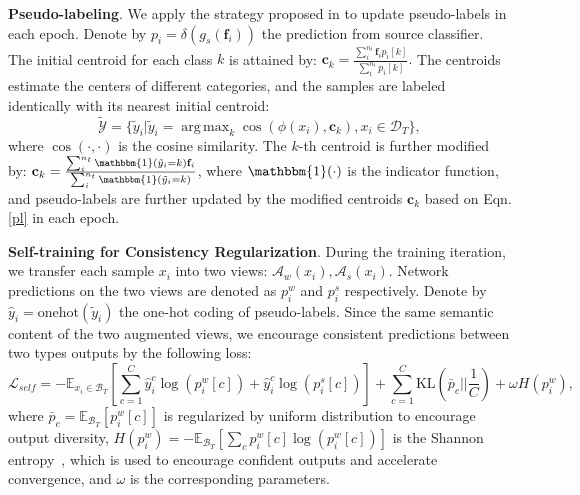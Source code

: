 \documentclass{article}
\def\vf{{\bm{f}}}
\DeclareMathOperator*{\argmax}{arg\,max}
\begin{document}
\textbf{Pseudo-labeling}. We apply the strategy proposed in \cite{shot} to update pseudo-labels in each epoch. Denote by ${p}_i = \delta(g_s(\vf_i))$ the prediction from source classifier. The initial centroid for each class $k$ is attained by:
$
    \textbf{c}_k = \frac{\sum_i^{n_t}\vf_i {p}_i[k]}{\sum_i^{n_t} {p}_i[k]}.
$
The centroids estimate the centers of different categories, and the samples are labeled identically with its nearest initial centroid:
\begin{equation}\label{pl}
\tilde{\mathcal{Y}}=\{
    \tilde{y}_i| \tilde{y}_i = \argmax_k \cos{(\phi(x_i),\textbf{c}_k)}, x_i \in \mathcal{D}_T \},
\end{equation}
where $\cos{(\cdot ,\cdot)}$ is the cosine similarity. The $k$-th centroid is further modified by: $\textbf{c}_k = \frac{\sum_i^{n_t} \mathbbm{1}(\tilde{y}_i=k)\textbf{f}_i}{\sum_i^{n_t} \mathbbm{1}(\tilde{y}_i=k)}$, where $\mathbbm{1}(\cdot)$ is the indicator function, and pseudo-labels are further updated by the modified centroids $\textbf{c}_k$ based on Eqn. \ref{pl} in each epoch. 

\textbf{Self-training for Consistency Regularization}. During the training iteration, we transfer each sample $x_i$ into two views: $\mathcal{A}_w(x_i),\mathcal{A}_s(x_i)$. Network predictions on the two views are denoted as $p_i^w$ and $p_i^s$ respectively.
Denote by $\hat{y}_i = \text{onehot}(\tilde{y}_i)$ the one-hot coding of pseudo-labels.
Since the same semantic content of the two augmented views, we encourage consistent predictions between two types outputs by the following loss:
\begin{equation}\label{eq:ce}
    \mathcal{L}_{self} = -\mathbb{E}_{x_i\in \mathcal{B}_T}  \left[\sum_{c=1}^C {\hat{y}^c_i}\log({p}_i^w[c])+{\hat{y}^c_i}\log( {p}_i^s[c]) \right]+\sum_{c=1}^C\text{KL}(\bar{p}_c||\frac{1}{C})+\omega H(p_i^w),
\end{equation}
where $\bar{{p}}_c = \mathbb{E}_{\mathcal{B}_T}[p^w_i[c]]$ is regularized by uniform distribution to encourage output diversity, $H(p_i^w) = -\mathbb{E}_{\mathcal{B}_T}[\sum_{c}{p}_i^w[c]\log({p}_i^w[c])]$ is the Shannon entropy~\cite{shannon_entropy}, which is used to encourage confident outputs and accelerate convergence, and $\omega$ is the corresponding parameters.
\end{document}
